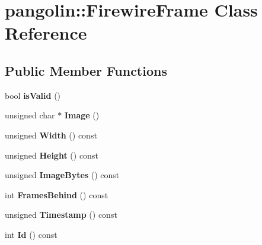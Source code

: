 \hypertarget{classpangolin_1_1_firewire_frame}{}\section{pangolin\+:\+:Firewire\+Frame Class Reference}
\label{classpangolin_1_1_firewire_frame}
\subsection*{Public Member Functions}
\begin{DoxyCompactItemize}
\item 
bool {\bfseries is\+Valid} ()\hypertarget{classpangolin_1_1_firewire_frame_a6c8c620953bdd907d197f29656c14183}{}\label{classpangolin_1_1_firewire_frame_a6c8c620953bdd907d197f29656c14183}

\item 
unsigned char $\ast$ {\bfseries Image} ()\hypertarget{classpangolin_1_1_firewire_frame_a34b4dbe6725396d33344424667d7ea43}{}\label{classpangolin_1_1_firewire_frame_a34b4dbe6725396d33344424667d7ea43}

\item 
unsigned {\bfseries Width} () const \hypertarget{classpangolin_1_1_firewire_frame_ab452dfaaf8189781bb0cc3225bb4e39f}{}\label{classpangolin_1_1_firewire_frame_ab452dfaaf8189781bb0cc3225bb4e39f}

\item 
unsigned {\bfseries Height} () const \hypertarget{classpangolin_1_1_firewire_frame_ae96b8a2616194ac1293ddbdeabc0825b}{}\label{classpangolin_1_1_firewire_frame_ae96b8a2616194ac1293ddbdeabc0825b}

\item 
unsigned {\bfseries Image\+Bytes} () const \hypertarget{classpangolin_1_1_firewire_frame_a4e8fa276023f9c69620c0378b3a70086}{}\label{classpangolin_1_1_firewire_frame_a4e8fa276023f9c69620c0378b3a70086}

\item 
int {\bfseries Frames\+Behind} () const \hypertarget{classpangolin_1_1_firewire_frame_a9510db1ba27dc5c64531603d4058b776}{}\label{classpangolin_1_1_firewire_frame_a9510db1ba27dc5c64531603d4058b776}

\item 
unsigned {\bfseries Timestamp} () const \hypertarget{classpangolin_1_1_firewire_frame_a4e30c4367d5e540394e25edfd5d0c6c9}{}\label{classpangolin_1_1_firewire_frame_a4e30c4367d5e540394e25edfd5d0c6c9}

\item 
int {\bfseries Id} () const \hypertarget{classpangolin_1_1_firewire_frame_a84880eaf3978a34fe65b2835bb00a651}{}\label{classpangolin_1_1_firewire_frame_a84880eaf3978a34fe65b2835bb00a651}

\end{DoxyCompactItemize}
